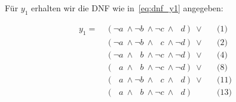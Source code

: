 \noindent
Für $y_1$ erhalten wir die DNF wie in~\ref{eq:dnf_y1} angegeben:


\begin{equation}\label{eq:dnf_y1}
\begin{alignat}{3}
    y_1 =\ &(\neg a \ \land \neg b \ \land \neg c \ \land \phantom{\neg} d)\ \lor && \text{(1)}  \\
    &(\neg a \ \land \neg b \ \land  \phantom{\neg} c \ \land \neg d)\ \lor && \text{(2)}  \\
    &(\neg a \ \land  \phantom{\neg} b \ \land \neg  c \ \land \neg d)\ \lor && \text{(4)}  \\
    &(\phantom{\neg} a \ \land  \phantom{\neg} b \ \land \neg  c \ \land \neg d)\ \lor && \text{(8)}  \\
    &(\phantom{\neg} a \ \land  \neg b \ \land \phantom{\neg} c \ \land  \phantom{\neg} d)\ \lor && \text{(11)}  \\
    &(\phantom{\neg} a \ \land   \phantom{\neg} b \ \land \neg c \ \land  \phantom{\neg} d) && \text{(13)}
\end{alignat}
\end{equation}